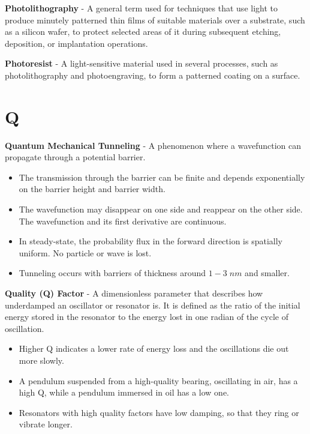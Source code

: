 \vspace{0.5cm}
\noindent
    \textbf{Photolithography} - A general term used for techniques that use light to produce minutely patterned thin films of suitable materials over a substrate, such as a silicon wafer, to protect selected areas of it during subsequent etching, deposition, or implantation operations.
    
\vspace{0.5cm}
\noindent
    \textbf{Photoresist} - A light-sensitive material used in several processes, such as photolithography and photoengraving, to form a patterned coating on a surface.
\section{Q}
    \textbf{Quantum Mechanical Tunneling} - A phenomenon where a wavefunction can propagate through a potential barrier.
\vspace{0.15cm}
    \begin{itemize}
        \setlength\itemsep{0.5em}
        \item{The transmission through the barrier can be finite and depends exponentially on the barrier height and barrier width.}
        \item{The wavefunction may disappear on one side and reappear on the other side. The wavefunction and its first derivative are continuous.}
        \item{In steady-state, the probability flux in the forward direction is spatially uniform. No particle or wave is lost.}
        \item{Tunneling occurs with barriers of thickness around $1-3\;nm$ and smaller.}
    \end{itemize}
\vspace{0.5cm}
    \textbf{Quality (Q) Factor} - A dimensionless parameter that describes how underdamped an oscillator or resonator is. It is defined as the ratio of the initial energy stored in the resonator to the energy lost in one radian of the cycle of oscillation.
    \begin{itemize}
        \setlength\itemsep{0.5em}
        \item{Higher Q indicates a lower rate of energy loss and the oscillations die out more slowly.}
        \item{A pendulum suspended from a high-quality bearing, oscillating in air, has a high Q, while a pendulum immersed in oil has a low one.}
        \item{Resonators with high quality factors have low damping, so that they ring or vibrate longer.}
    \end{itemize}
